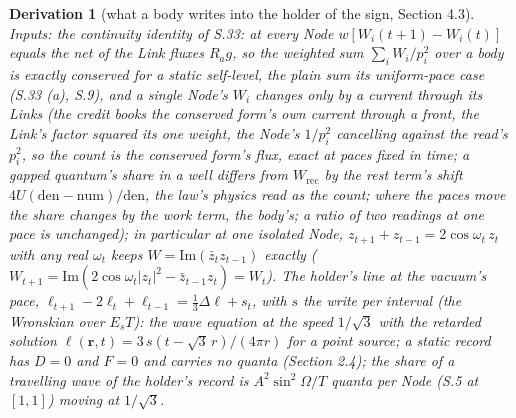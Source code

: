 \documentclass[pdflatex,sn-mathphys-num]{sn-jnl}
\newcommand{\num}{\mathrm{num}}
\newcommand{\den}{\mathrm{den}}
\theoremstyle{thmstyleone}
\newtheorem{derivation}{Derivation}
\begin{document}
\begin{derivation}[what a body writes into the holder of the sign, Section 4.3]
\emph{Inputs:} the continuity identity of S.33: at every Node $w[W_i(t+1) - W_i(t)]$ equals the net of the Link fluxes $R_a g$, so the weighted sum $\sum_i W_i / p_i^2$ over a body is exactly conserved for a static self-level, the plain sum its uniform-pace case (S.33 (a), S.9), and a single Node's $W_i$ changes only by a current through its Links (the credit books the conserved form's own current through a front, the Link's factor squared its one weight, the Node's $1 / p_i^2$ cancelling against the read's $p_i^2$, so the count is the conserved form's flux, exact at paces fixed in time; a gapped quantum's share in a well differs from $W_{\mathrm{rec}}$ by the rest term's shift $4U(\den - \num) / \den$, the law's physics read as the count; where the paces move the share changes by the work term, the body's; a ratio of two readings at one pace is unchanged); in particular at one isolated Node, $z_{t+1} + z_{t-1} = 2\cos\omega_t\,z_t$ with any real $\omega_t$ keeps $W = \mathrm{Im}(\bar z_t z_{t-1})$ exactly ($W_{t+1} = \mathrm{Im}(2\cos\omega_t|z_t|^2 - \bar z_{t-1}z_t) = W_t$). The holder's line at the vacuum's pace, $\ell_{t+1} - 2\ell_t + \ell_{t-1} = \tfrac13\Delta\ell + s_t$, with $s$ the write per interval (the Wronskian over $E_s T$): the wave equation at the speed $1 / \sqrt 3$ with the retarded solution $\ell(\mathbf r, t) = 3\,s(t - \sqrt 3\,r) / (4\pi r)$ for a point source; a static record has $D = 0$ and $F = 0$ and carries no quanta (Section 2.4); the share of a travelling wave of the holder's record is $A^2\sin^2\Omega / T$ quanta per Node (S.5 at $[1, 1]$) moving at $1 / \sqrt 3$.

\end{derivation}
\end{document}
